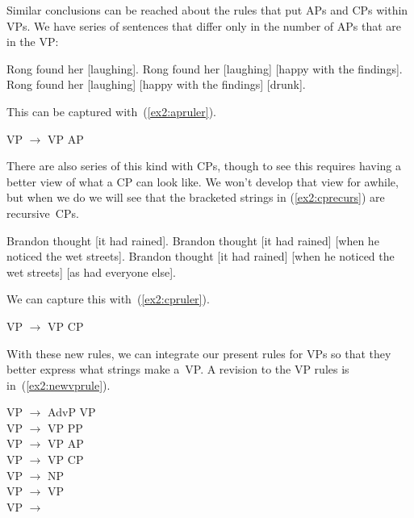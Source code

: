 Similar conclusions can be reached about the rules that put APs and CPs within VPs. We have series of sentences that differ only in the number of APs that are in the VP:
\begin{exe}
	\raggedright
	\ex \label{ex2:apseries} 
	\begin{xlist}
		\ex Rong found her [\AP laughing].
		\ex Rong found her [\AP laughing] [\AP happy with the findings].
		\ex Rong found her [\AP laughing] [\AP happy with the findings] [\AP drunk].
	\end{xlist}
\end{exe}
This can be captured with~(\ref{ex2:apruler}).
\begin{exe}
	\raggedright
	\ex \label{ex2:apruler} 
	VP $\rightarrow$ VP AP 
\end{exe}

There are also series of this kind with CPs, though to see this requires having a better view of what a CP can look like. We won't develop that view for awhile, but when we do we will see that the bracketed strings in (\ref{ex2:cprecurs}) are recursive~CPs.
\begin{exe}
	\raggedright
	\ex \label{ex2:cprecurs} 
	\begin{xlist}
		\ex Brandon thought [\CP it had rained].
		\ex Brandon thought [\CP it had rained] [\CP when he noticed the wet streets].
		\ex Brandon thought [\CP it had rained] [\CP when he noticed the wet streets] [\CP as had everyone else].
	\end{xlist}
\end{exe}
We can capture this with~(\ref{ex2:cpruler}).
\begin{exe}
	\raggedright
	\ex \label{ex2:cpruler} 
	VP $\rightarrow$ VP CP
\end{exe}

With these new rules, we can integrate our present rules for VPs so that they better express what strings make a~VP. A revision to the VP rules is in~(\ref{ex2:newvprule}).
\begin{exe}
	\raggedright
	\ex \label{ex2:newvprule} 
	VP $\rightarrow$ AdvP VP\\
	VP $\rightarrow$ VP PP\\
	VP $\rightarrow$ VP AP\\
	VP $\rightarrow$ VP CP\\
	VP $\rightarrow$  NP\\
	VP $\rightarrow$  VP\\
	VP $\rightarrow$  
\end{exe}

